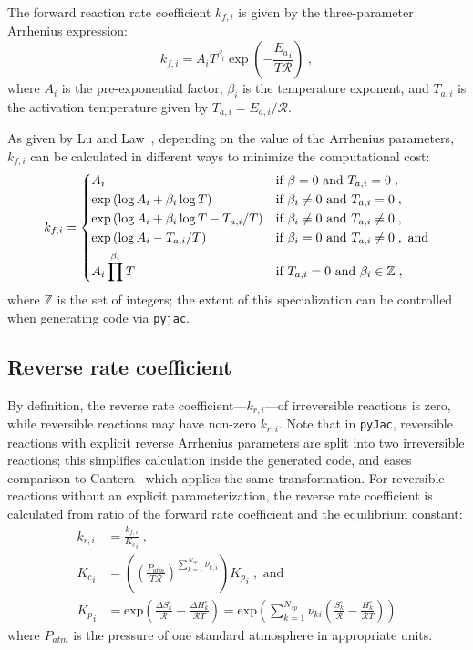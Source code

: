 \documentclass[12pt]{article}
\newcommand{\ns}{N_{sp}}
\newcommand{\Ru}{\mathcal{R}}
\begin{document}
The forward reaction rate coefficient $k_{f, i}$ is given by the three-parameter Arrhenius expression:
\begin{equation}
  \label{e:arrhenius}
  {k_{f, i}} = A_{i} T^{\beta_{i}} \operatorname{exp}\left({- \frac{{E_{a}}_{i}}{T \Ru}}\right) \;,
\end{equation}
where $A_i$ is the pre-exponential factor, $\beta_i$ is the temperature exponent, and $T_{a, i}$ is the activation temperature given by $T_{a, i} = E_{a, i} / \mathcal{R}$.

As given by Lu and Law~\cite{Lu:2009gh}, depending on the value of the Arrhenius parameters, $k_{f,i}$ can be calculated in different ways to minimize the computational cost:
\begin{equation}
  k_{f,i} =
  \begin{dcases}
  A_i & \text{if } \beta = 0 \text{ and } T_{a,i} = 0 \;, \\
  \exp \left( \log A_i + \beta_i \log T \right)   & \text{if } \beta_i \neq 0 \text{ and } T_{a, i} = 0 \;, \\
  \exp \left( \log A_i + \beta_i \log T - T_{a, i} / T \right) & \text{if } \beta_i \neq 0 \text{ and } T_{a, i} \neq 0 \;, \\
  \exp \left( \log A_i - T_{a, i} / T \right)  & \text{if } \beta_i = 0 \text{ and } T_{a, i} \neq 0 \;, \text{ and} \\
  A_i \prod^{\beta_i} T & \text{if } T_{a, i} = 0 \text{ and } \beta_i \in \mathbb{Z} \;,
  \end{dcases}
\end{equation}
where $\mathbb{Z}$ is the set of integers; the extent of this specialization can be controlled when generating code via \texttt{pyjac}.

\subsection{Reverse rate coefficient}
By definition, the reverse rate coefficient---${k_{r, i}}$---of irreversible reactions is zero, while reversible reactions may have non-zero ${k_{r, i}}$.
Note that in \texttt{pyJac}, reversible reactions with explicit reverse Arrhenius parameters are split into two irreversible reactions; this simplifies calculation inside the generated code, and eases comparison to Cantera~\cite{Goodwin:2015aa} which applies the same transformation.
For reversible reactions without an explicit parameterization, the reverse rate coefficient is calculated from ratio of the forward rate coefficient and the equilibrium constant:
\begin{align}
 {k_{r, i}} &= \frac{{k_{f, i}}}{{K_c}_{i}}\; , \label{e:kr}\\
 {K_c}_{i} &= \left(\left(\frac{P_{atm}}{T \Ru}\right)^{\sum_{k=1}^{\ns} \nu_{k,i}}\right) {K_p}_{i}\; ,\text{ and} \label{e:kc}\\
 {K_p}_{i} &= \text{exp}\left(\frac{\Delta S^{\circ}_k}{\Ru} - \frac{\Delta H^{\circ}_k}{\Ru T}\right) = \text{exp}\left(\sum_{k=1}^{\ns}\nu_{ki}\left(\frac{S^{\circ}_k}{\Ru} - \frac{H^{\circ}_k}{\Ru T}\right)\right) \label{e:kp}
\end{align}
where $P_{atm}$ is the pressure of one standard atmosphere in appropriate units.
\end{document}
